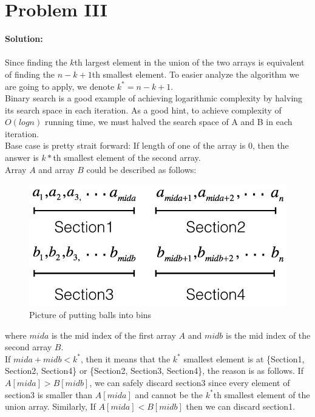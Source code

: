 \section{Problem III}

\textbf{Solution:} \\\\
Since finding the $k$th largest element in the union of the two arrays is equivalent of finding the $n - k + 1$th smallest element. To easier analyze the algorithm we are going to apply, we denote $k^* = n - k + 1$.\\

Binary search is a good example of achieving logarithmic complexity by halving its search space in each iteration. As a good hint, to achieve complexity of $O(logn)$ running time, we must halved the search space of A and B in each iteration.\\

Base case is pretty strait forward: If length of one of the array is 0, then the answer is $k*$th smallest element of the second array.\\

Array $A$ and array $B$ could be described as follows:

\begin{figure}[h]
\centering
\includegraphics[scale=0.4]{hw2p3}
\caption{Picture of putting balls into bins}
\label{fig:p3}
\end{figure}

where $mida$ is the mid index of the first array $A$ and $midb$ is the mid index of the second array $B$. \\

If $mida + midb < k^{*}$, then it means that the $k^*$ smallest element is at \{Section1, Section2, Section4\} or \{Section2, Section3, Section4\}, the reason is as follows. If $A[mida] > B[midb]$, we can safely discard section3 since every element of section3 is smaller than $A[mida]$ and cannot be the $k^{*}$th smallest element of the union array. Similarly, If $A[mida] < B[midb]$ then we can discard section1.\\

